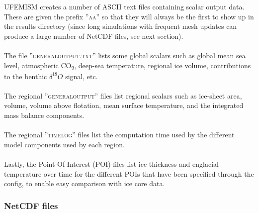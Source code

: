 \documentclass{article}
\begin{document}
UFEMISM creates a number of ASCII text files containing scalar output data. These are given the prefix ''\textsc{aa\textunderscore}'' so that they will always be the first to show up in the results directory (since long simulations with frequent mesh updates can produce a large number of NetCDF files, see next section).\\
\\
The file ''\textsc{general\textunderscore output.txt}'' lists some global scalars such as global mean sea level, atmospheric CO\textsubscript{2}, deep-sea temperature, regional ice volume, contributions to the benthic $\delta^{18}O$ signal, etc.\\
\\
The regional ''\textsc{general\textunderscore output}'' files list regional scalars such as ice-sheet area, volume, volume above flotation, mean surface temperature, and the integrated mass balance components.\\
\\
The regional ''\textsc{time\textunderscore log}'' files list the computation time used by the different model components used by each region.\\
\\
Lastly, the Point-Of-Interest (POI) files list ice thickness and englacial temperature over time for the different POIs that have been specified through the config, to enable easy comparison with ice core data.

\subsubsection{NetCDF files}
\end{document}
